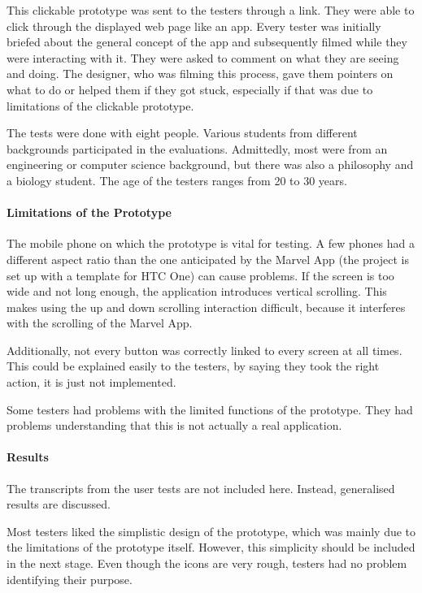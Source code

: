 \documentclass[10pt,twocolumn]{article} %
\begin{document}
This clickable prototype was sent to the testers through a link. They were  able to click through the displayed web page like an app. Every tester was initially briefed about the general concept of the app and subsequently filmed while they were interacting with it. They were asked to comment on what they are seeing and doing. The designer, who was filming this process, gave them pointers on what to do or helped them if they got stuck, especially if that was due to limitations of the clickable prototype. 

The tests were done with eight people. Various students from different backgrounds participated in the evaluations. Admittedly, most were from an engineering or computer science background, but there was also a philosophy and a biology student. The age of the testers ranges from 20 to 30 years. 

\paragraph{Limitations of the Prototype}
The mobile phone on which the prototype is vital for testing. A few phones had a different aspect ratio than the one anticipated by the Marvel App (the project is set up with a template for HTC One) can cause problems. If the screen is too wide and not long enough, the application introduces vertical scrolling. This makes using the up and down scrolling interaction difficult, because it interferes with the scrolling of the Marvel App.

Additionally, not every button was correctly linked to every screen at all times. This could be explained easily to the testers, by saying they took the right action, it is just not implemented.

Some testers had problems with the limited functions of the prototype. They had problems understanding that this is not actually a real application.

\paragraph{Results}
The transcripts from the user tests are not included here. Instead, generalised results are discussed. 

Most testers liked the simplistic design of the prototype, which was mainly due to the limitations of the prototype itself. However, this simplicity should be included in the next stage. Even though the icons are very rough, testers had no problem identifying their purpose. 
\end{document}
